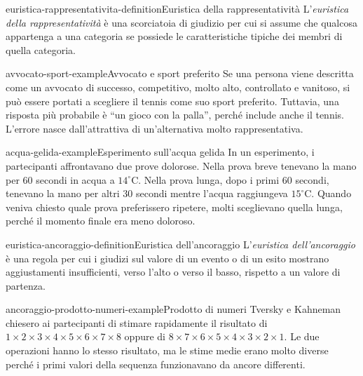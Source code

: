 \documentclass[preview]{standalone}
\begin{document}
\begin{snippetdefinition}{euristica-rappresentativita-definition}{Euristica della rappresentatività}
    L'\emph{euristica della rappresentatività} è una scorciatoia di giudizio per
    cui si assume che qualcosa appartenga a una categoria se possiede le
    caratteristiche tipiche dei membri di quella categoria.
\end{snippetdefinition}

\begin{snippetexample}{avvocato-sport-example}{Avvocato e sport preferito}
    Se una persona viene descritta come un avvocato di successo, competitivo,
    molto alto, controllato e vanitoso, si può essere portati a scegliere il
    tennis come suo sport preferito. Tuttavia, una risposta più probabile è
    ``un gioco con la palla'', perché include anche il tennis. L'errore nasce
    dall'attrattiva di un'alternativa molto rappresentativa.
\end{snippetexample}

\begin{snippetexample}{acqua-gelida-example}{Esperimento sull'acqua gelida}
    In un esperimento, i partecipanti affrontavano due prove dolorose. Nella
    prova breve tenevano la mano per \(60\) secondi in acqua a \(14^\circ\)C.
    Nella prova lunga, dopo i primi \(60\) secondi, tenevano la mano per altri
    \(30\) secondi mentre l'acqua raggiungeva \(15^\circ\)C. Quando veniva
    chiesto quale prova preferissero ripetere, molti sceglievano quella lunga,
    perché il momento finale era meno doloroso.
\end{snippetexample}


\begin{snippetdefinition}{euristica-ancoraggio-definition}{Euristica dell'ancoraggio}
    L'\emph{euristica dell'ancoraggio} è una regola per cui i giudizi sul valore
    di un evento o di un esito mostrano aggiustamenti insufficienti, verso
    l'alto o verso il basso, rispetto a un valore di partenza.
\end{snippetdefinition}

\begin{snippetexample}{ancoraggio-prodotto-numeri-example}{Prodotto di numeri}
    Tversky e Kahneman chiesero ai partecipanti di stimare rapidamente il
    risultato di \(1 \times 2 \times 3 \times 4 \times 5 \times 6 \times 7
    \times 8\) oppure di \(8 \times 7 \times 6 \times 5 \times 4 \times 3
    \times 2 \times 1\). Le due operazioni hanno lo stesso risultato, ma le
    stime medie erano molto diverse perché i primi valori della sequenza
    funzionavano da ancore differenti.
\end{snippetexample}
\end{document}
